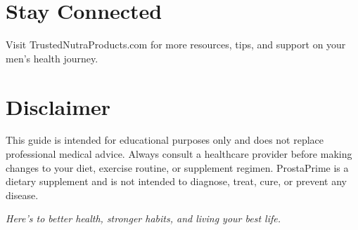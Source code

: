 \documentclass[11pt,oneside,openany]{book}
\begin{document}
\section*{Stay Connected}
Visit TrustedNutraProducts.com for more resources, tips, and support on your men's health journey.

\section*{Disclaimer}
This guide is intended for educational purposes only and does not replace professional medical advice. Always consult a healthcare provider before making changes to your diet, exercise routine, or supplement regimen. ProstaPrime is a dietary supplement and is not intended to diagnose, treat, cure, or prevent any disease.

\vspace{1cm}

\begin{center}
\textit{Here's to better health, stronger habits, and living your best life.}
\end{center}
\end{document}
